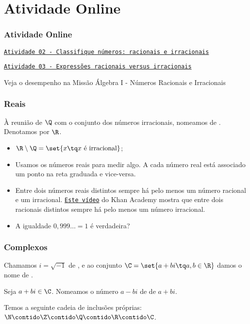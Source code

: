 
\section{Atividade Online}
\begin{frame}
\frametitle{Atividade Online} 

\href{https://pt.khanacademy.org/math/algebra/rational-and-irrational-numbers/modal/e/recognizing-rational-and-irrational-numbers}
{{\tt Atividade 02 - Classifique números: racionais e irracionais}}

\href{https://pt.khanacademy.org/math/algebra/rational-and-irrational-numbers/modal/e/recognizing-rational-and-irrational-expressions}
{{\tt Atividade 03 - Expressões racionais versus irracionais}}

Veja o desempenho na Missão Álgebra I - Números Racionais e
Irracionais


\end{frame}

\begin{frame}
\frametitle{Reais} 
\begin{definicao}
À reunião de $\Q$ com o conjunto dos números irracionais, nomeamos
de . Denotamos por $\R$.
\end{definicao}

\begin{itemize}
\item $\R \setminus \Q = \set {x \tq x \text{ é irracional}}$;
\item Usamos os números reais para medir algo. A cada número real
está associado um ponto na reta graduada e vice-versa.
\item Entre dois números reais distintos sempre há pelo menos um número racional e um
irracional.
\href{https://pt.khanacademy.org/math/algebra/rational-and-irrational-numbers/proofs-concerning-irrational-numbers/v/proof-that-there-is-an-irrational-number-between-any-two-rational-numbers}
{{\tt Este vídeo}} do Khan Academy mostra que entre dois racionais
distintos sempre há pelo menos um número irracional.
\item A igualdade $0,999\dots = 1 $ é verdadeira?
\end{itemize}
\end{frame}



\begin{frame}
\frametitle{Complexos} 
\begin{definicao}
Chamamos $i = \sqrt {-1}$ de , e ao conjunto
$\C = \set{ a+bi \tq a,b \in \R}$ damos o nome de .
\end{definicao}

Seja $a+bi \in \C$. Nomeamos o número $a-bi$ de  de
$a+bi$.

Temos a seguinte cadeia de inclusões próprias: $\N \contido \Z
\contido \Q \contido \R \contido \C$.
\end{frame}



